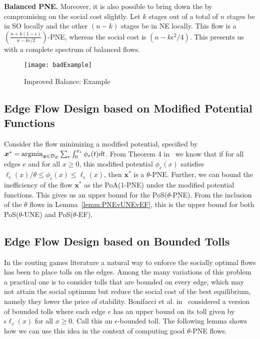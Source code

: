 \smallskip\noindent\textbf{Balanced PNE.} Moreover, it is also possible to bring down the {\efu} by compromising on the social cost slightly. Let $k$ stages out of a total of $n$ stages be in SO locally and the other $(n-k)$ stages be in NE locally. This flow is a 
$\left(\frac{n+k(1-\epsilon)}{n-k\epsilon/2}\right)$-PNE, whereas the social cost is $\left(n -k\epsilon^2/4\right)$. This presents us with a complete spectrum of balanced flows.  
\begin{figure}[!htb]
\centerline{\texttt{[image: badExample]}}
\caption{Improved Balance: Example}
\label{fig:badEgCasc}
\end{figure}

\subsection{Edge Flow Design based on Modified Potential Functions}\label{sec:designSubPoteFunc}
Consider the flow minimizing a modified potential, specified by $\bm{x}^* = \mathrm{argmin}_{\bm{x}\in \mathcal{D}_E} \sum_e \int_0^{x_e}\phi_e(t)dt$. 
From Theorem 4 in~\cite{christodoulou2011performance}  we know  that if for all edges $e$ and for all $x\geq 0$, this modified potential $\phi_e(x)$ satisfies $ \ell_e(x)/\theta\leq \phi_e(x)\leq \ell_e(x)$, then $\bm{x}^*$ is a $\theta$-PNE. Further, we can bound the inefficiency of the flow $\bm{x}^*$ as the PoA($1$-PNE) under the modified potential functions. This gives us an upper bound for the PoS($\theta$-PNE). From the inclusion of the $\theta$ flows in Lemma~\ref{lemm:PNEvUNEvEF}, this is the upper bound for both PoS($\theta$-UNE) and PoS($\theta$-EF). 

 


\subsection{Edge Flow Design based on Bounded Tolls} 
In the routing games literature a natural way to enforce the socially optimal flows has been to place tolls on the edges. Among the many variations of this problem a practical one is to consider tolls that are bounded on every edge, which may not attain the social optimum but reduce the social cost of the best equilibrium, namely they lower the price of stability. Bonifacci et al. in~\cite{bonifaci2011efficiency} considered a version of bounded tolls where each edge $e$ has an upper bound on its toll given by $\epsilon \ell_e(x)$ for all $x\geq 0$. Call this an $\epsilon$-bounded toll. The following lemma shows how we can use this idea in the context of computing good $\theta$-PNE flows.

